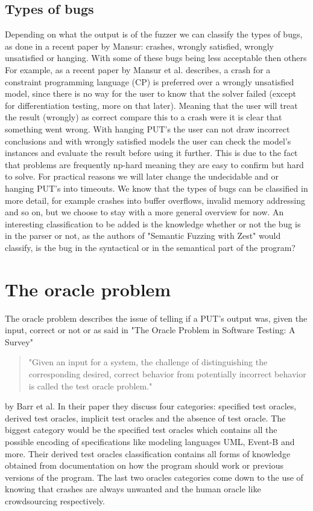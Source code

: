 \subsection{Types of bugs}
\label{cha:2:TypesOfBugs}
Depending on what the output is of the fuzzer we can classify the types of bugs, as done in a recent paper\cite{1mansur2020detecting} by Mansur: crashes, wrongly satisfied, wrongly unsatisfied or hanging. With some of these bugs being less acceptable then others 
For example, as a recent paper\cite{1mansur2020detecting} by Mansur et al. describes, a crash for a constraint programming language (CP) is preferred over a wrongly unsatisfied model, since there is no way for the user to know that the solver failed (except for differentiation testing, more on that later). Meaning that the user will treat the result (wrongly) as correct compare this to a crash were it is clear that something went wrong.
With hanging PUT's the user can not draw incorrect conclusions and with wrongly satisfied models the user can check the model's instances and evaluate the result before using it further. This is due to the fact that problems are frequently np-hard meaning they are easy to confirm but hard to solve. For practical reasons we will later change the undecidable and or hanging PUT's into timeouts. We know that the types of bugs can be classified in more detail, for example crashes into buffer overflows, invalid memory addressing and so on, but we choose to stay with a more general overview for now. An interesting classification to be added is the knowledge whether or not the bug is in the parser or not, as the authors of "Semantic Fuzzing with Zest"\cite{22SemanticFuzzing} would classify, is the bug in the syntactical or in the semantical part of the program?


\section{The oracle problem}
\label{cha:2:OracleProblem}
The oracle problem describes the issue of telling if a PUT's output was, given the input, correct or not or as said in "The Oracle Problem in Software Testing: A Survey"\cite{10barr2014oracleProblem} 
\begin{quote}
	"Given an input for a system, the challenge of distinguishing the corresponding desired, correct behavior from potentially incorrect behavior is called the test oracle problem."
\end{quote} by Barr et al.
In their paper they discuss four categories: specified test oracles, derived test oracles, implicit test oracles and the absence of test oracle. The biggest category would be the specified test oracles which contains all the possible encoding of specifications like modeling languages UML, Event-B and more. Their derived test oracles classification contains all forms of knowledge obtained from documentation on how the program should work or previous versions of the program. The last two oracles categories come down to the use of knowing that crashes are always unwanted and the human oracle like crowdsourcing respectively.

